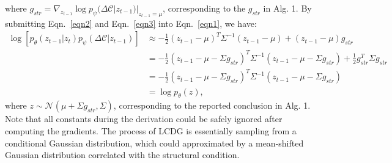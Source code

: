\documentclass{article}
\begin{document}
where $g_{str} = \nabla_{z_{t-1}} \log p_\psi ( \Delta \mathcal{C} | z_{t-1} ) |_{z_{t-1}=\mu}$, corresponding to the $g_{str}$ in Alg. 1. By submitting Eqn.~\ref{eqn2} and Eqn.~\ref{eqn3} into Eqn.~\ref{eqn1}, we have:
\begin{equation}
  \begin{aligned}
    \log \left[ p_\theta ( z_{t-1} | z_{t} ) p_\psi ( \Delta \mathcal{C} | z_{t-1} ) \right] &\approx -\frac{1}{2} ( z_{t-1} - \mu )^T\Sigma^{-1}( z_{t-1} - \mu ) + (z_{t-1} - \mu )g_{str}\\
    &= -\frac{1}{2} ( z_{t-1} - \mu - \Sigma g_{str} )^T \Sigma^{-1} ( z_{t-1} - \mu - \Sigma g_{str} ) + \frac{1}{2} g_{str}^T \Sigma g_{str}\\
    &= -\frac{1}{2} ( z_{t-1} - \mu - \Sigma g_{str} )^T \Sigma^{-1} ( z_{t-1} - \mu - \Sigma g_{str} )\\
    &= \log p_\theta(z),
  \end{aligned}
\end{equation}
where $z \sim \mathcal{N} ( \mu + \Sigma g_{str}, \Sigma )$, corresponding to the reported conclusion in Alg. 1. Note that all constants during the derivation could be safely ignored after computing the gradients. The process of LCDG is essentially sampling from a conditional Gaussian distribution, which could approximated by a mean-shifted Gaussian distribution correlated with the structural condition. 
\end{document}
